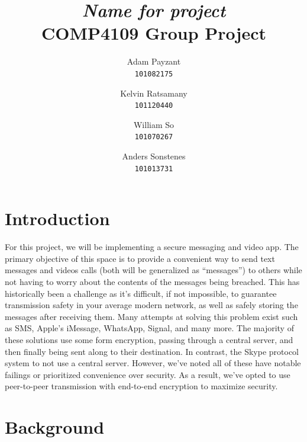 \documentclass[titlepage]{article}
\title{\textit{Name for project} \\
    \large COMP4109 Group Project
}
\author{Adam Payzant \\
    \texttt{101082175} \\
    \and
    Kelvin Ratsamany \\
    \texttt{101120440}
    \and
    William So \\
    \texttt{101070267} \\
    \and
    Anders Sonstenes \\
    \texttt{101013731}
}
\begin{document}
    \maketitle

    \section{Introduction}

    For this project, we will be implementing a secure messaging and video app.
    The primary objective of this space is to provide a convenient way to send text messages and videos calls (both will be generalized as ``messages'') to others while not having to worry about the contents of the messages being breached.
    This has historically been a challenge as it's difficult, if not impossible, to guarantee transmission safety in your average modern network, as well as safely storing the messages after receiving them.
    Many attempts at solving this problem exist such as SMS, Apple's iMessage, WhatsApp, Signal, and many more.
    The majority of these solutions use some form encryption, passing through a central server, and then finally being sent along to their destination.
    In contrast, the Skype protocol system to not use a central server.
    However, we've noted all of these have notable failings or prioritized convenience over security.
    As a result, we've opted to use peer-to-peer transmission with end-to-end encryption to maximize security.

    \section{Background}
\end{document}
